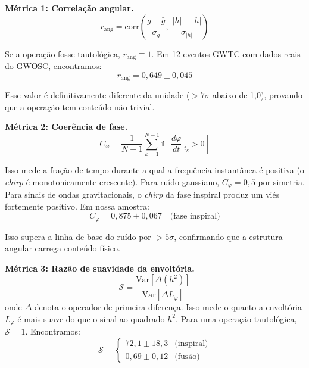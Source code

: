 \documentclass[12pt,a4paper,twocolumn]{article}
\begin{document}
\textbf{Métrica 1: Correlação angular.}
\begin{equation}
r_{\text{ang}} = \text{corr}\!\left(\frac{g - \bar{g}}{\sigma_g},\; \frac{|h| - \overline{|h|}}{\sigma_{|h|}}\right)
\end{equation}

Se a operação fosse tautológica, $r_{\text{ang}} \equiv 1$. Em 12 eventos GWTC com dados reais do GWOSC, encontramos:
\begin{equation}
\label{eq:corr-result}
r_{\text{ang}} = 0{,}649 \pm 0{,}045
\end{equation}

Esse valor é definitivamente diferente da unidade ($> 7\sigma$ abaixo de 1{,}0), provando que a operação tem conteúdo não-trivial.

\textbf{Métrica 2: Coerência de fase.}
\begin{equation}
C_\varphi = \frac{1}{N-1}\sum_{k=1}^{N-1} \mathbb{1}\!\left[\frac{d\varphi}{dt}\bigg|_{t_k} > 0\right]
\end{equation}

Isso mede a fração de tempo durante a qual a frequência instantânea é positiva (o \textit{chirp} é monotonicamente crescente). Para ruído gaussiano, $C_\varphi = 0{,}5$ por simetria. Para sinais de ondas gravitacionais, o \textit{chirp} da fase inspiral produz um viés fortemente positivo. Em nossa amostra:
\begin{equation}
C_\varphi = 0{,}875 \pm 0{,}067 \quad \text{(fase inspiral)}
\end{equation}

Isso supera a linha de base do ruído por $> 5\sigma$, confirmando que a estrutura angular carrega conteúdo físico.

\textbf{Métrica 3: Razão de suavidade da envoltória.}
\begin{equation}
\mathcal{S} = \frac{\text{Var}[\Delta(h^2)]}{\text{Var}[\Delta L_\varphi]}
\end{equation}
onde $\Delta$ denota o operador de primeira diferença. Isso mede o quanto a envoltória $L_\varphi$ é mais suave do que o sinal ao quadrado $h^2$. Para uma operação tautológica, $\mathcal{S} = 1$. Encontramos:
\begin{equation}
\mathcal{S} = \begin{cases}
72{,}1 \pm 18{,}3 & \text{(inspiral)} \\
0{,}69 \pm 0{,}12 & \text{(fusão)}
\end{cases}
\end{equation}
\end{document}
